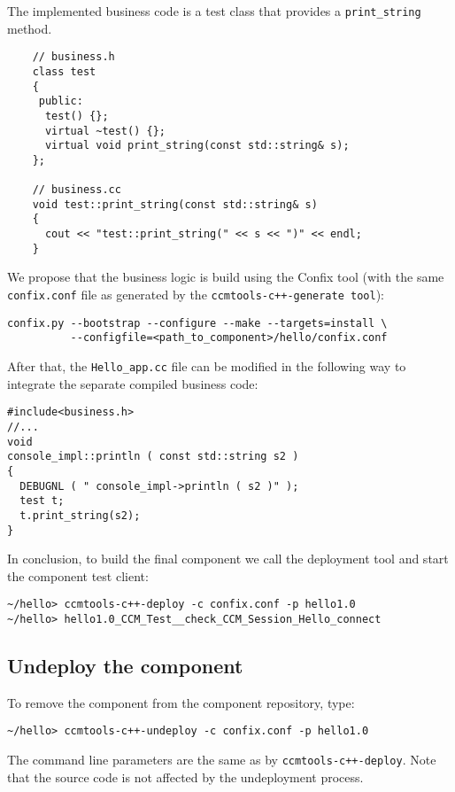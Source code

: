 \noindent
The implemented business code is a test class that provides a 
{\tt print\_string} method.
\begin{verbatim}
    // business.h	
    class test 
    {
     public:
      test() {};
      virtual ~test() {};
      virtual void print_string(const std::string& s);
    };

    // business.cc
    void test::print_string(const std::string& s)
    {
      cout << "test::print_string(" << s << ")" << endl;
    }
\end{verbatim}

\noindent
We propose that the business logic is build using the Confix tool (with the
same {\tt confix.conf} file as generated by the {\tt ccmtools-c++-generate tool}):
\begin{verbatim}
confix.py --bootstrap --configure --make --targets=install \
          --configfile=<path_to_component>/hello/confix.conf
\end{verbatim}

\noindent
After that, the {\tt Hello\_app.cc} file can be modified in the following way
to integrate the separate compiled business code:
\begin{verbatim}
#include<business.h>
//...
void
console_impl::println ( const std::string s2 )
{
  DEBUGNL ( " console_impl->println ( s2 )" );
  test t;
  t.print_string(s2);
}
\end{verbatim}

\noindent
In conclusion, to build the final component we call the deployment tool and start the
component test client:
\begin{verbatim}
~/hello> ccmtools-c++-deploy -c confix.conf -p hello1.0
~/hello> hello1.0_CCM_Test__check_CCM_Session_Hello_connect
\end{verbatim}



\subsection{Undeploy the component}

To remove the component from the component repository, type:
\begin{verbatim}
~/hello> ccmtools-c++-undeploy -c confix.conf -p hello1.0
\end{verbatim}
The command line parameters are the same as by {\tt ccmtools-c++-deploy}.
Note that the source code is not affected by the undeployment process.





